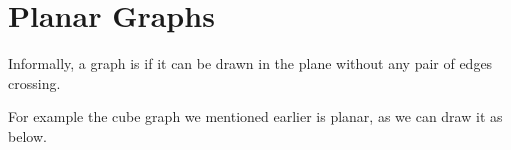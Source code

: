\section{Planar Graphs}

Informally, a graph is  if
it can be drawn in the plane without any pair of edges crossing.

For example the cube graph we mentioned earlier is planar, as we can draw it as below.

\begin{center}
	


\begin{tikzpicture}[x=0.75pt,y=0.75pt,yscale=-1,xscale=1]


\end{tikzpicture}
\end{center}
